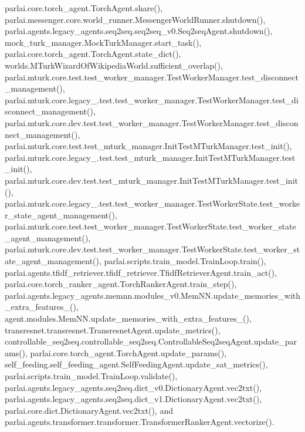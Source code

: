 parlai.\+core.\+torch\+\_\+agent.\+Torch\+Agent.\+share(), parlai.\+messenger.\+core.\+world\+\_\+runner.\+Messenger\+World\+Runner.\+shutdown(), parlai.\+agents.\+legacy\+\_\+agents.\+seq2seq.\+seq2seq\+\_\+v0.\+Seq2seq\+Agent.\+shutdown(), mock\+\_\+turk\+\_\+manager.\+Mock\+Turk\+Manager.\+start\+\_\+task(), parlai.\+core.\+torch\+\_\+agent.\+Torch\+Agent.\+state\+\_\+dict(), worlds.\+M\+Turk\+Wizard\+Of\+Wikipedia\+World.\+sufficient\+\_\+overlap(), parlai.\+mturk.\+core.\+test.\+test\+\_\+worker\+\_\+manager.\+Test\+Worker\+Manager.\+test\+\_\+disconnect\+\_\+management(), parlai.\+mturk.\+core.\+legacy\+\_.\+test.\+test\+\_\+worker\+\_\+manager.\+Test\+Worker\+Manager.\+test\+\_\+disconnect\+\_\+management(), parlai.\+mturk.\+core.\+dev.\+test.\+test\+\_\+worker\+\_\+manager.\+Test\+Worker\+Manager.\+test\+\_\+disconnect\+\_\+management(), parlai.\+mturk.\+core.\+test.\+test\+\_\+mturk\+\_\+manager.\+Init\+Test\+M\+Turk\+Manager.\+test\+\_\+init(), parlai.\+mturk.\+core.\+legacy\+\_.\+test.\+test\+\_\+mturk\+\_\+manager.\+Init\+Test\+M\+Turk\+Manager.\+test\+\_\+init(), parlai.\+mturk.\+core.\+dev.\+test.\+test\+\_\+mturk\+\_\+manager.\+Init\+Test\+M\+Turk\+Manager.\+test\+\_\+init(), parlai.\+mturk.\+core.\+legacy\+\_.\+test.\+test\+\_\+worker\+\_\+manager.\+Test\+Worker\+State.\+test\+\_\+worker\+\_\+state\+\_\+agent\+\_\+management(), parlai.\+mturk.\+core.\+test.\+test\+\_\+worker\+\_\+manager.\+Test\+Worker\+State.\+test\+\_\+worker\+\_\+state\+\_\+agent\+\_\+management(), parlai.\+mturk.\+core.\+dev.\+test.\+test\+\_\+worker\+\_\+manager.\+Test\+Worker\+State.\+test\+\_\+worker\+\_\+state\+\_\+agent\+\_\+management(), parlai.\+scripts.\+train\+\_\+model.\+Train\+Loop.\+train(), parlai.\+agents.\+tfidf\+\_\+retriever.\+tfidf\+\_\+retriever.\+Tfidf\+Retriever\+Agent.\+train\+\_\+act(), parlai.\+core.\+torch\+\_\+ranker\+\_\+agent.\+Torch\+Ranker\+Agent.\+train\+\_\+step(), parlai.\+agents.\+legacy\+\_\+agents.\+memnn.\+modules\+\_\+v0.\+Mem\+N\+N.\+update\+\_\+memories\+\_\+with\+\_\+extra\+\_\+features\+\_\+(), agent.\+modules.\+Mem\+N\+N.\+update\+\_\+memories\+\_\+with\+\_\+extra\+\_\+features\+\_\+(), transresnet.\+transresnet.\+Transresnet\+Agent.\+update\+\_\+metrics(), controllable\+\_\+seq2seq.\+controllable\+\_\+seq2seq.\+Controllable\+Seq2seq\+Agent.\+update\+\_\+params(), parlai.\+core.\+torch\+\_\+agent.\+Torch\+Agent.\+update\+\_\+params(), self\+\_\+feeding.\+self\+\_\+feeding\+\_\+agent.\+Self\+Feeding\+Agent.\+update\+\_\+sat\+\_\+metrics(), parlai.\+scripts.\+train\+\_\+model.\+Train\+Loop.\+validate(), parlai.\+agents.\+legacy\+\_\+agents.\+seq2seq.\+dict\+\_\+v0.\+Dictionary\+Agent.\+vec2txt(), parlai.\+agents.\+legacy\+\_\+agents.\+seq2seq.\+dict\+\_\+v1.\+Dictionary\+Agent.\+vec2txt(), parlai.\+core.\+dict.\+Dictionary\+Agent.\+vec2txt(), and parlai.\+agents.\+transformer.\+transformer.\+Transformer\+Ranker\+Agent.\+vectorize().

